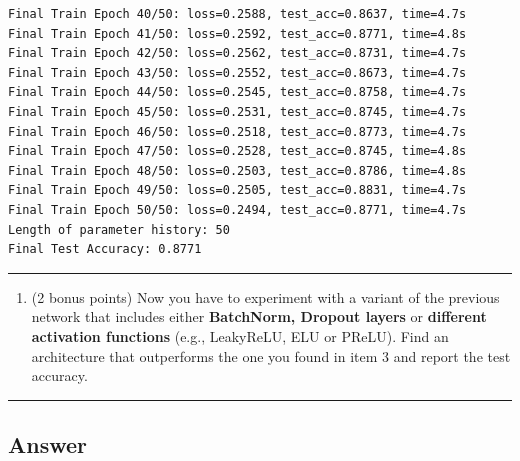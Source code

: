 \documentclass[
  letterpaper,
  DIV=11,
  numbers=noendperiod]{scrartcl}
\providecommand{\tightlist}{%
  \setlength{\itemsep}{0pt}\setlength{\parskip}{0pt}}\usepackage{longtable,booktabs,array}
\begin{document}
\begin{verbatim}
Final Train Epoch 40/50: loss=0.2588, test_acc=0.8637, time=4.7s
Final Train Epoch 41/50: loss=0.2592, test_acc=0.8771, time=4.8s
Final Train Epoch 42/50: loss=0.2562, test_acc=0.8731, time=4.7s
Final Train Epoch 43/50: loss=0.2552, test_acc=0.8673, time=4.7s
Final Train Epoch 44/50: loss=0.2545, test_acc=0.8758, time=4.7s
Final Train Epoch 45/50: loss=0.2531, test_acc=0.8745, time=4.7s
Final Train Epoch 46/50: loss=0.2518, test_acc=0.8773, time=4.7s
Final Train Epoch 47/50: loss=0.2528, test_acc=0.8745, time=4.8s
Final Train Epoch 48/50: loss=0.2503, test_acc=0.8786, time=4.8s
Final Train Epoch 49/50: loss=0.2505, test_acc=0.8831, time=4.7s
Final Train Epoch 50/50: loss=0.2494, test_acc=0.8771, time=4.7s
Length of parameter history: 50
Final Test Accuracy: 0.8771
\end{verbatim}

\begin{center}\rule{0.5\linewidth}{0.5pt}\end{center}

\begin{enumerate}
\def\labelenumi{\arabic{enumi}.}
\setcounter{enumi}{3}
\tightlist
\item
  (2 bonus points) Now you have to experiment with a variant of the
  previous network that includes either \textbf{BatchNorm, Dropout
  layers} or \textbf{different activation functions} (e.g., LeakyReLU,
  ELU or PReLU). Find an architecture that outperforms the one you found
  in item 3 and report the test accuracy.
\end{enumerate}

\begin{center}\rule{0.5\linewidth}{0.5pt}\end{center}

\subsection{Answer}\label{answer-6}
\end{document}
